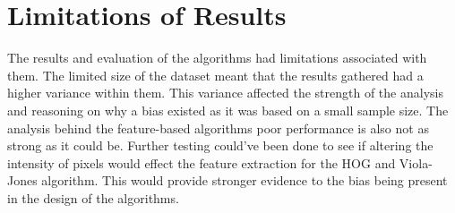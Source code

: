 \documentclass{l4proj}
\begin{document}
\section{Limitations of Results}
%
The results and evaluation of the algorithms had limitations associated with them. The limited size of the dataset meant that the results gathered had a higher variance within them. This variance affected the strength of the analysis and reasoning on why a bias existed as it was based on a small sample size. The analysis behind the feature-based algorithms poor performance is also not as strong as it could be. Further testing could've been done to see if altering the intensity of pixels would effect the feature extraction for the HOG and Viola-Jones algorithm. This would provide stronger evidence to the bias being present in the design of the algorithms. 

\end{document}
